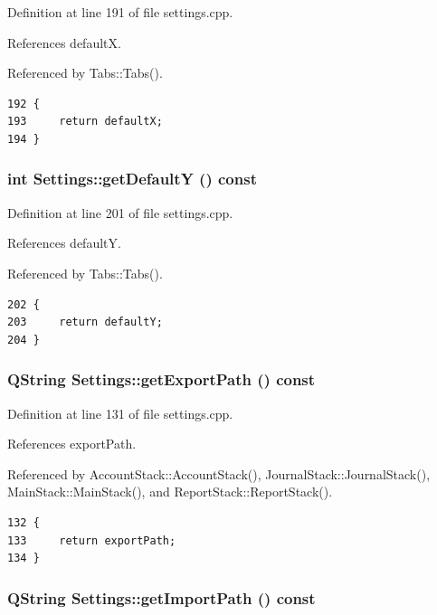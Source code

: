 Definition at line 191 of file settings.cpp.

References default\-X.

Referenced by Tabs::Tabs().

\footnotesize\begin{verbatim}192 {
193     return defaultX;
194 }
\end{verbatim}\normalsize 


\hypertarget{classSettings_a17}{
\subsubsection[getDefaultY]{\setlength{\rightskip}{0pt plus 5cm}int Settings::get\-Default\-Y () const}}
\label{classSettings_a17}


Definition at line 201 of file settings.cpp.

References default\-Y.

Referenced by Tabs::Tabs().

\footnotesize\begin{verbatim}202 {
203     return defaultY;
204 }
\end{verbatim}\normalsize 


\hypertarget{classSettings_a3}{
\subsubsection[getExportPath]{\setlength{\rightskip}{0pt plus 5cm}QString Settings::get\-Export\-Path () const}}
\label{classSettings_a3}


Definition at line 131 of file settings.cpp.

References export\-Path.

Referenced by Account\-Stack::Account\-Stack(), Journal\-Stack::Journal\-Stack(), Main\-Stack::Main\-Stack(), and Report\-Stack::Report\-Stack().

\footnotesize\begin{verbatim}132 {
133     return exportPath;
134 }
\end{verbatim}\normalsize 


\hypertarget{classSettings_a5}{
\subsubsection[getImportPath]{\setlength{\rightskip}{0pt plus 5cm}QString Settings::get\-Import\-Path () const}}
\label{classSettings_a5}


